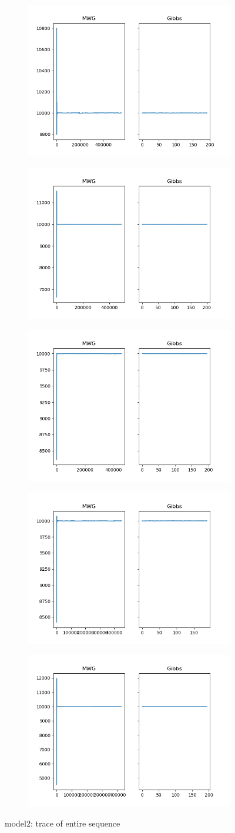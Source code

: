 \begin{figure}[H]
    \centering
    \begin{subfigure}
    	\centering
        \includegraphics[width=0.3\linewidth]{../../plots/Trace_M2_N20000_NMCMC3_seed0_diffind2.png}
    \end{subfigure}
    \begin{subfigure}
        \centering
    	\includegraphics[width=0.3\linewidth]{../../plots/Trace_M2_N20000_NMCMC3_seed1_diffind2.png}
	\end{subfigure}
	\begin{subfigure}
	    \centering
    	\includegraphics[width=0.3\linewidth]{../../plots/Trace_M2_N20000_NMCMC3_seed2_diffind2.png}
	\end{subfigure}
	\begin{subfigure}
	    \centering
    	\includegraphics[width=0.3\linewidth]{../../plots/Trace_M2_N20000_NMCMC3_seed3_diffind2.png}
	\end{subfigure}
	\begin{subfigure}
	    \centering
    	\includegraphics[width=0.3\linewidth]{../../plots/Trace_M2_N20000_NMCMC3_seed4_diffind2.png}
	\end{subfigure}
	\caption{model2: trace of entire sequence}
\end{figure}


